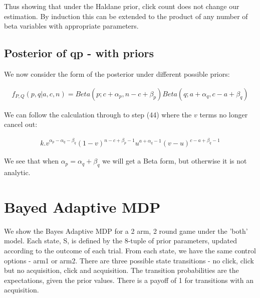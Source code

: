 \documentclass[11pt,a4,singlespacing,titlepagenumber=on]{scrreprt}
\numberwithin{equation}{chapter} %
\theoremstyle{remark}
\begin{document}
Thus showing that under the Haldane prior, click count does not change our estimation. By induction this can be extended to the product of any number of beta variables with appropriate parameters.

\subsection{Posterior of qp - with priors}

We now consider the form of the posterior under different possible priors:

\begin{align}
 f_{P,Q}(p,q|a,c,n) = Beta(p;c+\alpha_p,n-c+\beta_p) Beta(q;a+\alpha_q,c-a+\beta_q)
\end{align}

We can follow the calculation through to step (44) where the $v$ terms no longer cancel out:

\begin{align}
 k . v^{\alpha_p - \alpha_q - \beta_q}(1-v)^{n-c+\beta_p-1} u^{a+\alpha_q-1} (v - u)^{c-a+\beta_q-1}
\end{align}

We see that when $ \alpha_p = \alpha_q + \beta_q $ we will get a Beta form, but otherwise it is not analytic. 

\section{Bayed Adaptive MDP}

We show the Bayes Adaptive MDP for a 2 arm, 2 round game under the 'both' model. Each state, S, is defined by the 8-tuple of prior parameters, updated according to the outcome of each trial. From each state, we have the same control options - arm1 or arm2. There are three possible state transitions - no click, click but no acquisition, click and acquisition. The transition probabilities are the expectations, given the prior values. There is a payoff of 1 for transitions with an acquisition.
\end{document}
